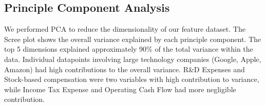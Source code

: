 \documentclass[11pt,]{article}
\begin{document}
\hypertarget{principle-component-analysis-1}{%
\subsection{Principle Component
Analysis}\label{principle-component-analysis-1}}

We performed PCA to reduce the dimensionality of our feature dataset.
The Scree plot shows the overall variance explained by each principle
component. The top 5 dimensions explained approximately 90\% of the
total variance within the data. Individual datapoints involving large
technology companies (Google, Apple, Amazon) had high contributions to
the overall variance. R\&D Expenses and Stock-based compensation were
two variables with high contribution to variance, while Income Tax
Expense and Operating Cash Flow had more negligible contribution.
\end{document}
